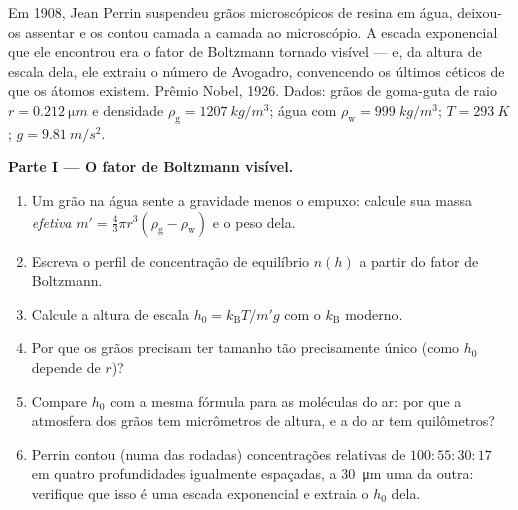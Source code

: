 \begin{problem}\label{pb:b3:canonical-ensemble:1}
Em 1908, Jean Perrin suspendeu grãos microscópicos de resina em água,
deixou-os assentar e os contou camada a camada ao microscópio. A escada
exponencial que ele encontrou era o fator de Boltzmann tornado visível
--- e, da altura de escala dela, ele extraiu o número de Avogadro,
convencendo os últimos céticos de que os átomos existem. Prêmio Nobel,
1926. Dados: grãos de goma-guta de raio $r =
\qty{0.212}{\micro m}$ e densidade $\rho_{\text{g}} =
\qty{1207}{kg/m^3}$; água com $\rho_{\text{w}} = \qty{999}{kg/m^3}$;
$T = \qty{293}{K}$; $g = \qty{9.81}{m/s^2}$.

\medskip\noindent\textbf{Parte I --- O fator de Boltzmann visível.}
\begin{enumerate}
  \item Um grão na água sente a gravidade menos o empuxo: calcule sua
        massa \emph{efetiva} $m' = \tfrac43\pi r^3(\rho_{\text{g}}
        - \rho_{\text{w}})$ e o peso dela.
  \item Escreva o perfil de concentração de equilíbrio $n(h)$ a partir
        do fator de Boltzmann.
  \item Calcule a altura de escala $h_0 = k_{\text{B}}T/m'g$ com o
        $k_{\text{B}}$ moderno.
  \item Por que os grãos precisam ter tamanho tão precisamente único
        (como $h_0$ depende de $r$)?
  \item Compare $h_0$ com a mesma fórmula para as moléculas do ar: por
        que a atmosfera dos grãos tem micrômetros de altura, e a do ar
        tem quilômetros?
  \item Perrin contou (numa das rodadas) concentrações relativas de
        $100 : 55 : 30 : 17$ em quatro profundidades igualmente
        espaçadas, a \qty{30}{\micro m} uma da outra: verifique que
        isso é uma escada exponencial e extraia o $h_0$ dela.
\end{enumerate}


\end{problem}
